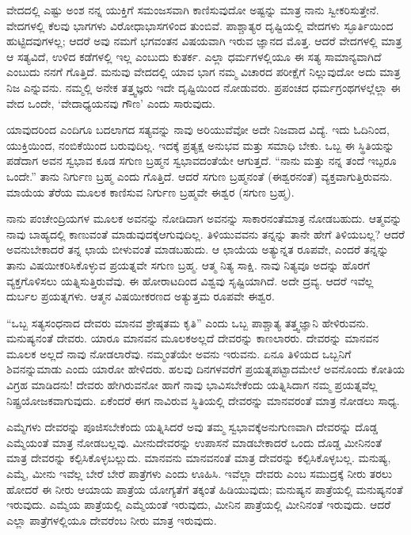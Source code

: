ವೇದದಲ್ಲಿ ಎಷ್ಟು ಅಂಶ ನನ್ನ ಯುಕ್ತಿಗೆ ಸಮಂಜಸವಾಗಿ ಕಾಣಿಸುವುದೋ ಅಷ್ಟನ್ನು ಮಾತ್ರ ನಾನು ಸ್ವೀಕರಿಸುತ್ತೇನೆ. ವೇದಗಳಲ್ಲಿ ಕೆಲವು ಭಾಗಗಳು ವಿರೋಧಾಭಾಸಗಳಿಂದ ತುಂಬಿವೆ. ಪಾಶ್ಚಾತ್ಯರ ದೃಷ್ಟಿಯಲ್ಲಿ ವೇದಗಳು ಸ್ಫೂರ್ತಿಯಿಂದ ಹುಟ್ಟಿದವುಗಳಲ್ಲ; ಆದರೆ ಅವು ನಮಗೆ ಭಗವಂತನ ವಿಷಯವಾಗಿ ಇರುವ ಜ್ಞಾನದ ಮೊತ್ತ. ಆದರೆ ವೇದಗಳಲ್ಲಿ ಮಾತ್ರ ಆ ಸತ್ಯವಿದೆ, ಉಳಿದ ಕಡೆಗಳಲ್ಲಿ ಇಲ್ಲ ಎಂಬುದು ಕುತರ್ಕ. ಎಲ್ಲಾ ಧರ್ಮಗಳಲ್ಲಿಯೂ ಈ ಸತ್ಯ ಸಾಮಾನ್ಯವಾಗಿದೆ ಎಂಬುದು ನನಗೆ ಗೊತ್ತಿದೆ. ಮನುವು ವೇದದಲ್ಲಿ ಯಾವ ಭಾಗ ನಮ್ಮ ವಿಚಾರದ ಪರೀಕ್ಷೆಗೆ ನಿಲ್ಲುವುದೋ ಅದು ಮಾತ್ರ ನಿಜ ಎನ್ನುವನು. ನಮ್ಮಲ್ಲಿ ಅನೇಕ ತತ್ತ್ವಜ್ಞರು ಇದೇ ದೃಷ್ಟಿಯಿಂದ ನೋಡುವರು. ಪ್ರಪಂಚದ ಧರ್ಮಗ್ರಂಥಗಳಲ್ಲೆಲ್ಲಾ ಈ ವೇದ ಒಂದೇ, ‘ವೇದಾಧ್ಯಯನವು ಗೌಣ’ ಎಂದು ಸಾರುವುದು.

ಯಾವುದರಿಂದ ಎಂದಿಗೂ ಬದಲಾಗದ ಸತ್ಯವನ್ನು ನಾವು ಅರಿಯುವೆವೋ ಅದೇ ನಿಜವಾದ ವಿದ್ಯೆ. ಇದು ಓದಿನಿಂದ, ಯುಕ್ತಿಯಿಂದ, ನಂಬಿಕೆಯಿಂದ ಬರುವುದಿಲ್ಲ. ಇದಕ್ಕೆ ಪ್ರತ್ಯಕ್ಷ ಅನುಭವ ಮತ್ತು ಸಮಾಧಿ ಬೇಕು. ಒಬ್ಬ ಈ ಸ್ಥಿತಿಯನ್ನು ಪಡೆದಾಗ ಅವನ ಸ್ವಭಾವ ಕೂಡ ಸಗುಣ ಬ್ರಹ್ಮನ ಸ್ವಭಾವದಂತೆಯೇ ಆಗುತ್ತದೆ. “ನಾನು ಮತ್ತು ನನ್ನ ತಂದೆ ಇಬ್ಪರೂ ಒಂದೇ.” ತಾನು ನಿರ್ಗುಣ ಬ್ರಹ್ಮ ಎಂದು ಗೊತ್ತಿದೆ. ಆದರೆ ಸಗುಣ ಬ್ರಹ್ಮನಂತೆ (ಈಶ್ವರನಂತೆ) ವ್ಯಕ್ತವಾಗುತ್ತಿರುವನು. ಮಾಯೆಯ ತೆರೆಯ ಮೂಲಕ ಕಾಣಿಸುವ ನಿರ್ಗುಣ ಬ್ರಹ್ಮವೇ ಈಶ್ವರ (ಸಗುಣ ಬ್ರಹ್ಮ).

ನಾನು ಪಂಚೇಂದ್ರಿಯಗಳ ಮೂಲಕ ಅವನನ್ನು ನೋಡಿದಾಗ ಅವನನ್ನು ಸಾಕಾರನಂತೆ\break ಮಾತ್ರ ನೋಡಬಹುದು. ಆತ್ಮವನ್ನು ನಾವು ಬಾಹ್ಯದಲ್ಲಿ ಕಾಣುವಂತೆ ಮಾಡುವುದಕ್ಕೆ\break ಆಗುವುದಿಲ್ಲ. ತಿಳಿಯುವವನು ತನ್ನನ್ನು ತಾನೇ ಹೇಗೆ ತಿಳಿಯಬಲ್ಲ? ಆದರೆ ಅವನು\break ಬೇಕಾದರೆ ತನ್ನ ಛಾಯೆ ಬೀಳುವಂತೆ ಮಾಡಬಹುದು. ಆ ಛಾಯೆಯ ಅತ್ಯುನ್ನತ ರೂಪವೇ, ಎಂದರೆ ತನ್ನನ್ನು ತಾನು ವಿಷಯೀಕರಿಸಿಕೊಳ್ಳುವ ಪ್ರಯತ್ನವೇ ಸಗುಣ ಬ್ರಹ್ಮ. ಆತ್ಮ ನಿತ್ಯ ಸಾಕ್ಷಿ. ನಾವು ನಿತ್ಯವೂ ಅದನ್ನು ಹೊರಗೆ ವ್ಯಕ್ತಗೊಳಿಸಲು ಯತ್ನಿಸುತ್ತಿರುವೆವು. ಈ ಹೋರಾಟದಿಂದ ವಿಶ್ವವು ಸೃಷ್ಟಿಯಾಗಿದೆ. ಅದೇ ದ್ರವ್ಯ. ಆದರೆ ಇವೆಲ್ಲ ದುರ್ಬಲ ಪ್ರಯತ್ನಗಳು. ಆತ್ಮನ ವಿಷಯೀಕರಣದ ಅತ್ಯುತ್ತಮ ರೂಪವೇ ಈಶ್ವರ.

“ಒಬ್ಬ ಸತ್ಯಸಂಧನಾದ ದೇವರು ಮಾನವ ಶ್ರೇಷ್ಠತಮ ಕೃತಿ” ಎಂದು ಒಬ್ಬ ಪಾಶ್ಚಾತ್ಯ ತತ್ತ್ವಜ್ಞಾನಿ ಹೇಳಿರುವನು. ಮನುಷ್ಯನಂತೆ ದೇವರು. ಯಾರೂ ಮಾನವನ ಮೂಲಕ\break ಅಲ್ಲದೆ ದೇವರನ್ನು ಕಾಣಲಾರರು. ದೇವರನ್ನು ಮಾನವನ ಮೂಲಕ ಅಲ್ಲದೆ ನಾವು ನೋಡಲಾರೆವು. ನಮ್ಮಂತೆಯೇ ಅವನು ಇರುವನು. ಏನೂ ತಿಳಿಯದ ಒಬ್ಬನಿಗೆ ಶಿವನನ್ನು\break ಮಾಡು ಎಂದು ಯಾರೋ ಹೇಳಿದರು. ಹಲವು ದಿನಗಳವರೆಗೆ ಪ್ರಯತ್ನಪಟ್ಟಾದ\break ಮೇಲೆ ಅವನೊಂದು ಕೋತಿಯ ವಿಗ್ರಹ ಮಾಡಿದನು! ದೇವರು ಹೇಗಿರುವನೋ ಹಾಗೆ ನಾವು ಭಾವಿಸಬೇಕೆಂದು ಯತ್ನಿಸಿದಾಗ ನಮ್ಮ ಪ್ರಯತ್ನವೆಲ್ಲ ನಿಷ್ಪ್ರಯೋಜಕವಾಗುವುದು. ಏಕೆಂದರೆ ಈಗ ನಾವಿರುವ ಸ್ಥಿತಿಯಲ್ಲಿ ದೇವರನ್ನು ಮಾನವರಂತೆ ಮಾತ್ರ ನೋಡಲು ಸಾಧ್ಯ.

ಎಮ್ಮೆಗಳು ದೇವರನ್ನು ಪೂಜಿಸಬೇಕೆಂದು ಯತ್ನಿಸಿದರೆ ಅವು ತಮ್ಮ ಸ್ವಭಾವಕ್ಕೆ\break ಅನುಗುಣವಾಗಿ ದೇವರನ್ನು ದೊಡ್ಡ ಎಮ್ಮೆಯಂತೆ ಮಾತ್ರ ನೋಡಬಲ್ಲವು. ಮೀನು\break ದೇವರನ್ನು ಉಪಾಸನೆ ಮಾಡಬೇಕಾದರೆ ಒಂದು ದೊಡ್ಡ ಮೀನಿನಂತೆ ಮಾತ್ರ ದೇವರನ್ನು ಕಲ್ಪಿಸಿಕೊಳ್ಳಬಲ್ಲುದು. ಮಾನವನು ಮಾನವನಂತೆ ಮಾತ್ರ ದೇವರನ್ನು ಕಲ್ಪಿಸಿಕೊಳ್ಳಬಲ್ಲ. ಮನುಷ್ಯ, ಎಮ್ಮೆ, ಮೀನು ಇವೆಲ್ಲ ಬೇರೆ ಬೇರೆ ಪಾತ್ರೆಗಳು ಎಂದು ಊಹಿಸಿ. ಇವೆಲ್ಲಾ ದೇವರು ಎಂಬ ಸಮುದ್ರಕ್ಕೆ ನೀರು ತರಲು ಹೋದರೆ ಈ ನೀರು ಆಯಾಯ ಪಾತ್ರೆಯ ಯೋಗ್ಯತೆಗೆ ತಕ್ಕಂತೆ ಹಿಡಿಯುವುದು; ಮನುಷ್ಯನ ಪಾತ್ರೆಯಲ್ಲಿ ಮನುಷ್ಯನಂತೆ ಇರುವುದು. ಎಮ್ಮೆಯ ಪಾತ್ರೆಯಲ್ಲಿ ಎಮ್ಮೆಯಂತೆ ಇರುವುದು, ಮೀನಿನ ಪಾತ್ರೆಯಲ್ಲಿ ಮೀನಿನಂತೆ ಇರುವುದು. ಆದರೆ ಎಲ್ಲಾ ಪಾತ್ರೆಗಳಲ್ಲಿಯೂ ದೇವರೆಂಬ ನೀರು ಮಾತ್ರ ಇರುವುದು.

